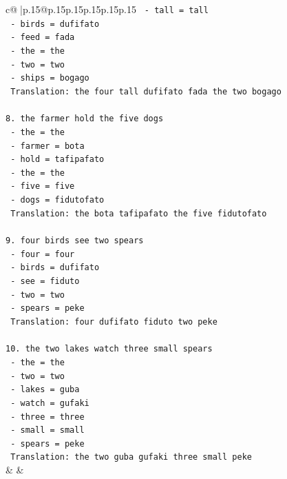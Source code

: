 \documentclass{article}
\begin{document}
{\begin{supertabular}{c@{$\;$}|p{.15\linewidth}@{}p{.15\linewidth}p{.15\linewidth}p{.15\linewidth}p{.15\linewidth}p{.15\linewidth}}
{{{\texttt{   {-} tall = tall} \\
\texttt{   {-} birds = dufifato} \\
\texttt{   {-} feed = fada} \\
\texttt{   {-} the = the} \\
\texttt{   {-} two = two} \\
\texttt{   {-} ships = bogago} \\
\texttt{   Translation: the four tall dufifato fada the two bogago} \\
\\ 
\texttt{8. the farmer hold the five dogs} \\
\texttt{   {-} the = the} \\
\texttt{   {-} farmer = bota} \\
\texttt{   {-} hold = tafipafato} \\
\texttt{   {-} the = the} \\
\texttt{   {-} five = five} \\
\texttt{   {-} dogs = fidutofato} \\
\texttt{   Translation: the bota tafipafato the five fidutofato} \\
\\ 
\texttt{9. four birds see two spears} \\
\texttt{   {-} four = four} \\
\texttt{   {-} birds = dufifato} \\
\texttt{   {-} see = fiduto} \\
\texttt{   {-} two = two} \\
\texttt{   {-} spears = peke} \\
\texttt{   Translation: four dufifato fiduto two peke} \\
\\ 
\texttt{10. the two lakes watch three small spears} \\
\texttt{    {-} the = the} \\
\texttt{    {-} two = two} \\
\texttt{    {-} lakes = guba} \\
\texttt{    {-} watch = gufaki} \\
\texttt{    {-} three = three} \\
\texttt{    {-} small = small} \\
\texttt{    {-} spears = peke} \\
\texttt{    Translation: the two guba gufaki three small peke} \\
            }
        }
    }
    & & \\ \\


\end{supertabular}}
\end{document}
